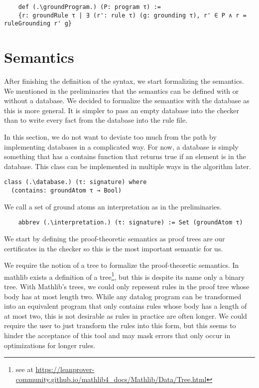\begin{lstlisting}
    def (.\groundProgram.) (P: program τ) := 
    {r: groundRule τ | ∃ (r': rule τ) (g: grounding τ), r' ∈ P ∧ r = ruleGrounding r' g}
\end{lstlisting}

\section{Semantics}

After finishing the definition of the syntax, we start formalizing the semantics. We mentioned in the preliminaries that the semantics can be defined with or without a database. We decided to formalize the semantics with the database as this is more general. It is simpler to pass an empty database into the checker than to write every fact from the database into the rule file.

In this section, we do not want to deviate too much from the path by implementing databases in a complicated way. For now, a database is simply something that has a contains function that returns true if an element is in the database. This class can be implemented in multiple ways in the algorithm later.

\begin{lstlisting}
class (.\database.) (τ: signature) where
  (contains: groundAtom τ → Bool)
\end{lstlisting}

We call a set of ground atoms an interpretation as in the preliminaries.
\begin{lstlisting}
    abbrev (.\interpretation.) (τ: signature) := Set (groundAtom τ)
\end{lstlisting}

We start by defining the proof-theoretic semantics as proof trees are our certificates in the checker so this is the most important semantic for us.

We require the notion of a tree to formalize the proof-theoretic semantics. In mathlib exists a definition of a tree\footnote{see at \protect\url{https://leanprover-community.github.io/mathlib4_docs/Mathlib/Data/Tree.html}}, but this is despite its name only a binary tree. With Mathlib's trees, we could only represent rules in the proof tree whose body has at most length two. While any datalog program can be transformed into an equivalent program that only contains rules whose body has a length of at most two, this is not desirable as rules in practice are often longer. We could require the user to just transform the rules into this form, but this seems to hinder the acceptance of this tool and may mask errors that only occur in optimizations for longer rules.

